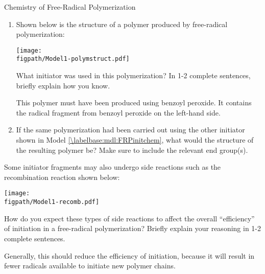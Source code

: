 \begin{activity}{Chemistry of Free-Radical Polymerization}
\begin{ctqs}
\begin{enumerate}
				\begin{solution}[1in]
					Yes - it is located at the end of the chain opposite the radical site.
				\end{solution}
			
			 \item Shown below is the structure of a polymer produced by free-radical polymerization:
	
			\centerline{\texttt{[image: \\figpath/Model1-polymstruct.pdf]}}
	
			What initiator was used in this polymerization?  In 1-2 complete sentences, briefly explain how you know.
	
				\begin{solution}[1.75in]
					This polymer must have been produced using benzoyl peroxide.  It contains the radical fragment from benzoyl peroxide on the left-hand side.
				\end{solution}
			
			\item If the same polymerization had been carried out using the other initiator shown in Model \ref{\labelbase:mdl:FRPinitchem}, what would the structure of the resulting polymer be?  Make sure to include the relevant end group(s).
	
				\begin{solution}[1.75in]\end{solution}
				
		\end{enumerate}
		
	\question Some initiator fragments may also undergo side reactions such as the recombination reaction shown below:
	
			\centerline{\texttt{[image: \\figpath/Model1-recomb.pdf]}}
			
				How do you expect these types of side reactions to affect the overall ``efficiency'' of initiation in a free-radical polymerization? Briefly explain your reasoning in 1-2 complete sentences.
	
				\begin{solution}[1.25in]
					Generally, this should reduce the efficiency of initiation, because it will result in fewer radicals available to initiate new polymer chains.
					

\end{solution}
\end{ctqs}
\end{activity}

